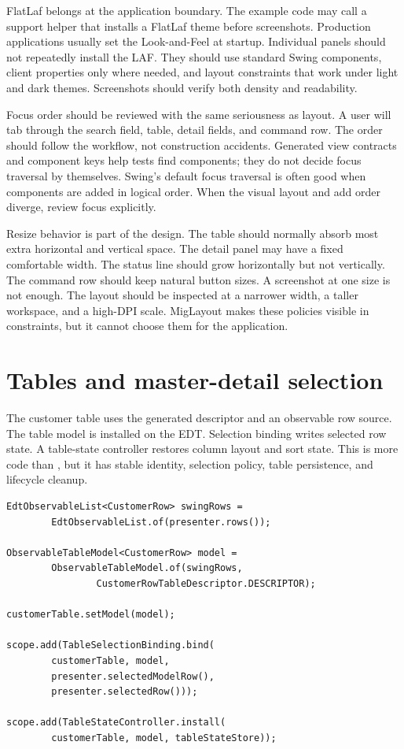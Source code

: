 FlatLaf belongs at the application boundary. The example code may call a
support helper that installs a FlatLaf theme before screenshots. Production
applications usually set the Look-and-Feel at startup. Individual panels
should not repeatedly install the LAF. They should use standard Swing
components, client properties only where needed, and layout constraints that
work under light and dark themes. Screenshots should verify both density and
readability.

Focus order should be reviewed with the same seriousness as layout. A user
will tab through the search field, table, detail fields, and command row. The
order should follow the workflow, not construction accidents. Generated view
contracts and component keys help tests find components; they do not decide
focus traversal by themselves. Swing's default focus traversal is often good
when components are added in logical order. When the visual layout and add
order diverge, review focus explicitly.

Resize behavior is part of the design. The table should normally absorb most
extra horizontal and vertical space. The detail panel may have a fixed
comfortable width. The status line should grow horizontally but not vertically.
The command row should keep natural button sizes. A screenshot at one size is
not enough. The layout should be inspected at a narrower width, a taller
workspace, and a high-DPI scale. MigLayout makes these policies visible in
constraints, but it cannot choose them for the application.

\section{Tables and master-detail selection}

The customer table uses the generated descriptor and an observable row source.
The table model is installed on the EDT. Selection binding writes selected row
state. A table-state controller restores column layout and sort state. This is
more code than , but it has stable identity,
selection policy, table persistence, and lifecycle cleanup.

\begin{lstlisting}[caption={Table assembly shape.}]
EdtObservableList<CustomerRow> swingRows =
        EdtObservableList.of(presenter.rows());

ObservableTableModel<CustomerRow> model =
        ObservableTableModel.of(swingRows,
                CustomerRowTableDescriptor.DESCRIPTOR);

customerTable.setModel(model);

scope.add(TableSelectionBinding.bind(
        customerTable, model,
        presenter.selectedModelRow(),
        presenter.selectedRow()));

scope.add(TableStateController.install(
        customerTable, model, tableStateStore));
\end{lstlisting}

